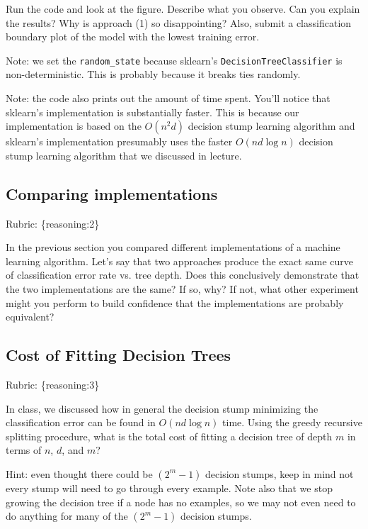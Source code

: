 \documentclass{article}
\def\rubric#1{\gre{Rubric: \{#1\}}}{}
\def\blu#1{{\color{blu}#1}}
\def\gre#1{{\color{gre}#1}}
\begin{document}
Run the code and look at the figure.
\blu{Describe what you observe. Can you explain the results?} Why is approach (1) so disappointing? Also, \blu{submit a classification boundary plot of the model with the lowest training error}.

Note: we set the \verb|random_state| because sklearn's \texttt{DecisionTreeClassifier} is non-deterministic. This is probably
because it breaks ties randomly.

Note: the code also prints out the amount of time spent. You'll notice that sklearn's implementation is substantially faster. This is because
our implementation is based on the $O(n^2d)$ decision stump learning algorithm and sklearn's implementation presumably uses the faster $O(nd\log n)$
decision stump learning algorithm that we discussed in lecture.

\subsection{Comparing implementations}
\rubric{reasoning:2}

In the previous section you compared different implementations of a machine learning algorithm. Let's say that two
approaches produce the exact same curve of classification error rate vs. tree depth. Does this conclusively demonstrate
that the two implementations are the same? If so, why? If not, what other experiment might you perform to build confidence
that the implementations are probably equivalent?


\subsection{Cost of Fitting Decision Trees}
\rubric{reasoning:3}

In class, we discussed how in general the decision stump minimizing the classification error can be found in $O(nd\log n)$ time.
Using the greedy recursive splitting procedure, \blu{what is the total cost of fitting a decision tree of depth $m$ in terms of $n$, $d$, and $m$?}

Hint: even thought there could be $(2^m-1)$ decision stumps, keep in mind not every stump will need to go through every example. Note also that we stop growing the decision tree if a node has no examples, so we may not even need to do anything for many of the $(2^m-1)$ decision stumps.
\end{document}
